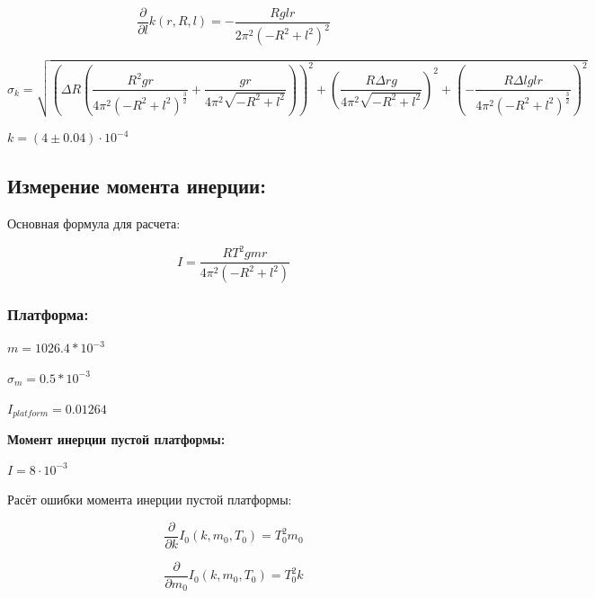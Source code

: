 \documentclass[12pt]{extarticle}
\begin{document}
\vspace{3mm}

$$\displaystyle \frac{\partial}{\partial l} k{\left(r,R,l \right)} = - \frac{R g l r}{2 \pi^{2} \left(- R^{2} + l^{2}\right)^{2}}$$

\vspace{3mm}

$$\displaystyle \sigma_{k} = \sqrt{\left(\Delta{R} \left(\frac{R^{2} g r}{4 \pi^{2} \left(- R^{2} + l^{2}\right)^{\frac{3}{2}}} + \frac{g r}{4 \pi^{2} \sqrt{- R^{2} + l^{2}}}\right)\right)^{2} + \left(\frac{R \Delta{r} g}{4 \pi^{2} \sqrt{- R^{2} + l^{2}}}\right)^{2} + \left(- \frac{R \Delta{l} g l r}{4 \pi^{2} \left(- R^{2} + l^{2}\right)^{\frac{3}{2}}}\right)^{2}}$$

\vspace{3mm}

$k = (4 \pm 0.04) \cdot 10^{-4}$

\subsection{Измерение момента инерции:}

Основная формула для расчета:

$$\displaystyle I = \frac{R T^{2} g m r}{4 \pi^{2} \left(- R^{2} + l^{2}\right)}$$

\subsubsection{Платформа:}

$m = 1026.4*10^{-3}$

$\sigma_m = 0.5*10^{-3}$

$I_{platform} = 0.01264$

\vspace{3mm}

\textbf{\large{Момент инерции пустой платформы:}}

\vspace{3mm}

$\displaystyle I = 8 \cdot 10^{-3}$
\vspace{3mm}


Расёт ошибки момента инерции пустой платформы:

$$\displaystyle \frac{\partial}{\partial k} I_{0}{\left(k,m_{0},T_{0} \right)} = T_{0}^{2} m_{0}$$

\vspace{3mm}

$$\displaystyle \frac{\partial}{\partial m_{0}} I_{0}{\left(k,m_{0},T_{0} \right)} = T_{0}^{2} k$$
\end{document}
